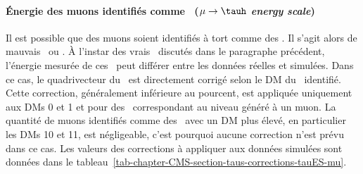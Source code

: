\paragraph{Énergie des muons identifiés comme \tauh\ (\emph{$\mu\to\tauh$ energy scale})}
Il est possible que des muons soient identifiés à tort comme des \tauh.
Il s'agit alors de mauvais \tauh\ ou \og \ftauhs \fg{}.
À l'instar des vrais \tauh\ discutés dans le paragraphe précédent, l'énergie mesurée de ces \ftauhs\ peut différer entre les données réelles et simulées.
Dans ce cas, le quadrivecteur du \ftauh\ est directement corrigé selon le DM du \tauh\ identifié.
Cette correction, généralement inférieure au pourcent, est appliquée uniquement aux DMs 0 et 1 et pour des \tauh\ correspondant au niveau généré à un muon.
La quantité de muons identifiés comme des \tauh\ avec un DM plus élevé, en particulier les DMs 10 et 11, est négligeable, c'est pourquoi aucune correction n'est prévu dans ce cas.
Les valeurs des corrections à appliquer aux données simulées sont données dans le tableau~\ref{tab-chapter-CMS-section-taus-corrections-tauES-mu}.
